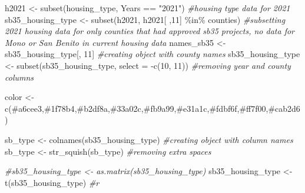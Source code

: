 \documentclass[
]{article}
\newenvironment{Shaded}{\begin{snugshade}}{\end{snugshade}}
\newcommand{\AttributeTok}[1]{\textcolor[rgb]{0.77,0.63,0.00}{#1}}
\newcommand{\CommentTok}[1]{\textcolor[rgb]{0.56,0.35,0.01}{\textit{#1}}}
\newcommand{\DecValTok}[1]{\textcolor[rgb]{0.00,0.00,0.81}{#1}}
\newcommand{\FunctionTok}[1]{\textcolor[rgb]{0.00,0.00,0.00}{#1}}
\newcommand{\NormalTok}[1]{#1}
\newcommand{\OtherTok}[1]{\textcolor[rgb]{0.56,0.35,0.01}{#1}}
\newcommand{\SpecialCharTok}[1]{\textcolor[rgb]{0.00,0.00,0.00}{#1}}
\newcommand{\StringTok}[1]{\textcolor[rgb]{0.31,0.60,0.02}{#1}}
\begin{document}
\begin{Shaded}
\begin{Highlighting}[]
\NormalTok{h2021 }\OtherTok{\textless{}{-}} \FunctionTok{subset}\NormalTok{(housing\_type, Years }\SpecialCharTok{==} \StringTok{"2021"}\NormalTok{) }\CommentTok{\#housing type data for 2021}
\NormalTok{sb35\_housing\_type }\OtherTok{\textless{}{-}} \FunctionTok{subset}\NormalTok{(h2021, h2021[ ,}\DecValTok{11}\NormalTok{] }\SpecialCharTok{\%in\%}\NormalTok{ counties) }\CommentTok{\#subsetting 2021 housing data for only counties that had approved sb35 projects, no data for Mono or San Benito in current housing data}
\NormalTok{names\_sb35 }\OtherTok{\textless{}{-}}\NormalTok{ sb35\_housing\_type[, }\DecValTok{11}\NormalTok{] }\CommentTok{\#creating object with county names}
\NormalTok{sb35\_housing\_type }\OtherTok{\textless{}{-}} \FunctionTok{subset}\NormalTok{(sb35\_housing\_type, }\AttributeTok{select =} \SpecialCharTok{{-}}\FunctionTok{c}\NormalTok{(}\DecValTok{10}\NormalTok{, }\DecValTok{11}\NormalTok{)) }\CommentTok{\#removing year and county columns}

\NormalTok{color }\OtherTok{\textless{}{-}} \FunctionTok{c}\NormalTok{(}\StringTok{\textquotesingle{}\#a6cee3\textquotesingle{}}\NormalTok{,}\StringTok{\textquotesingle{}\#1f78b4\textquotesingle{}}\NormalTok{,}\StringTok{\textquotesingle{}\#b2df8a\textquotesingle{}}\NormalTok{,}\StringTok{\textquotesingle{}\#33a02c\textquotesingle{}}\NormalTok{,}\StringTok{\textquotesingle{}\#fb9a99\textquotesingle{}}\NormalTok{,}\StringTok{\textquotesingle{}\#e31a1c\textquotesingle{}}\NormalTok{,}\StringTok{\textquotesingle{}\#fdbf6f\textquotesingle{}}\NormalTok{,}\StringTok{\textquotesingle{}\#ff7f00\textquotesingle{}}\NormalTok{,}\StringTok{\textquotesingle{}\#cab2d6\textquotesingle{}}\NormalTok{)}

\NormalTok{sb\_type }\OtherTok{\textless{}{-}} \FunctionTok{colnames}\NormalTok{(sb35\_housing\_type) }\CommentTok{\#creating object with column names}
\NormalTok{sb\_type }\OtherTok{\textless{}{-}} \FunctionTok{str\_squish}\NormalTok{(sb\_type) }\CommentTok{\#removing extra spaces}

\CommentTok{\#sb35\_housing\_type \textless{}{-} as.matrix(sb35\_housing\_type)}
\NormalTok{sb35\_housing\_type }\OtherTok{\textless{}{-}} \FunctionTok{t}\NormalTok{(sb35\_housing\_type) }\CommentTok{\#r}


\end{Highlighting}
\end{Shaded}
\end{document}
